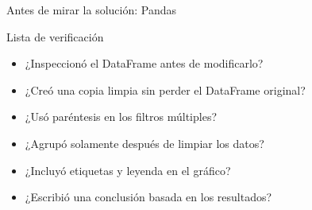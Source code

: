 \documentclass[10pt]{beamer}
\begin{document}
\begin{frame}{Antes de mirar la solución: Pandas}
  \begin{block}{Lista de verificación}
    \begin{itemize}
      \item ¿Inspeccionó el DataFrame antes de modificarlo?
      \item ¿Creó una copia limpia sin perder el DataFrame original?
      \item ¿Usó paréntesis en los filtros múltiples?
      \item ¿Agrupó solamente después de limpiar los datos?
      \item ¿Incluyó etiquetas y leyenda en el gráfico?
      \item ¿Escribió una conclusión basada en los resultados?
    \end{itemize}
  \end{block}
\end{frame}
\end{document}
